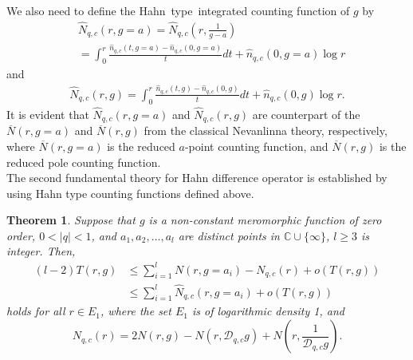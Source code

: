 \documentclass[sn-mathphys-num]{sn-jnl}%
\theoremstyle{thmstyleone}%
\newtheorem{theorem}{Theorem}%
\theoremstyle{thmstyletwo}%
\theoremstyle{thmstylethree}%
\begin{document}
\indent We also need to define the Hahn~type~integrated counting function of $g$ by
\begin{align*}
	&\hat{N}_{q,c}(r,g=a)=\hat{N}_{q,c}\left(r,\frac{1}{g-a}\right)\\
	&=\int_{0}^{r}\frac{\hat{n}_{q,c}(t,g=a)-\hat{n}_{q,c}(0,g=a)}{t}dt+\hat{n}_{q,c}(0,g=a)\log r
\end{align*}
and
\begin{align*}
	\hat{N}_{q,c}(r,g)=\int_{0}^{r}\frac{\hat{n}_{q,c}(t,g)-\hat{n}_{q,c}(0,g)}{t}dt+\hat{n}_{q,c}(0,g)\log r.
\end{align*}
\indent It is evident that $\hat{N}_{q,c}(r,g=a)$ and $\hat{N}_{q,c}(r,g)$ are counterpart of the $\overline{N}(r,g=a)$ and $\overline{N}(r,g)$ from the classical Nevanlinna theory, respectively, where $\overline{N}(r,g=a)$ is the reduced \(a\)-point counting function, and $\overline{N}(r,g)$ is the reduced pole counting function.\\
\indent The second fundamental theory for Hahn difference operator is established by using Hahn type counting functions defined above.
\begin{theorem}\label{thm2}
	Suppose that $g$ is a non-constant meromorphic function of zero order, $0<|q|<1$, and $a_{1},a_{2},\ldots,a_{l}$ are distinct points in $\mathbb{C}\cup\{\infty\}$, \(l\ge 3\) is integer. Then,
	\begin{align}\label{t1}
		(l-2)T(r,g)&\leq\sum_{i=1}^{l}N(r,g=a_{i})-N_{q,c}(r)+o(T(r,g))\nonumber\\
		&\leq\sum_{i=1}^{l}\hat{N}_{q,c}(r,g=a_{i})+o(T(r,g))
	\end{align}
	holds for all $r\in E_{1}$, where the set $E_{1}$ is of logarithmic density 1, and $$N_{q,c}(r)=2N(r,g)-N(r,\mathcal{D}_{q,c}g)+N\left(r,\frac{1}{\mathcal{D}_{q,c}g}\right).$$
\end{theorem}
\end{document}
